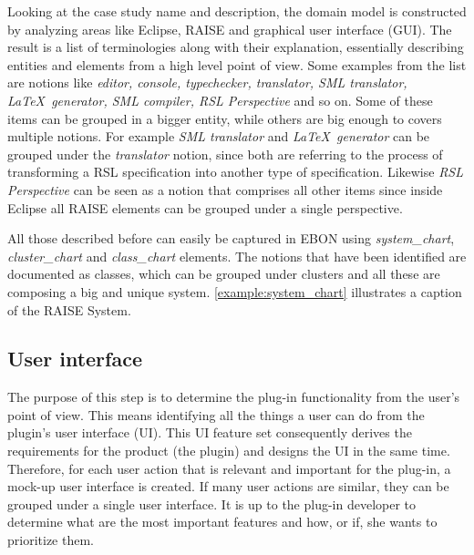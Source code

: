 \documentclass[conference]{IEEEtran}
\begin{document}
Looking at the case study name and description, the domain model is
constructed by analyzing areas like Eclipse, RAISE and graphical user
interface (GUI). The result is a list of terminologies along with
their explanation, essentially describing entities and elements from a
high level point of view. Some examples from the list are notions
like \emph{editor, console, typechecker, translator, SML translator,
\LaTeX\ generator, SML compiler, RSL Perspective} and so on. Some of
these items can be grouped in a bigger entity, while others are
big enough to covers multiple notions. For example \emph{SML translator}
and \emph{\LaTeX\ generator} can be grouped under the
\emph{translator} notion, since both are referring to the process of
transforming a RSL specification into another type of specification.
Likewise \emph{RSL Perspective} can be seen as a notion that comprises
all other items since inside Eclipse all RAISE elements can be grouped
under a single perspective.



All those described before can easily be captured in EBON using
\emph{system\_chart}, \emph{cluster\_chart} and \emph{class\_chart}
elements. The notions that have been identified are documented as
classes, which can be grouped under clusters and all these are
composing a big and unique system. \autoref{example:system_chart}
illustrates a caption of the RAISE System.

%
\subsection{User interface}
\label{sec:user-interface}

The purpose of this step is to determine the plug-in functionality from the
user's point of view. This means identifying all the things a user can
do from the plugin's user interface (UI). This UI feature set
consequently derives the requirements for the product (the plugin) and
designs the UI in the same time. Therefore, for each user action that
is relevant and important for the plug-in, a mock-up user interface is
created. If many user actions are similar, they can be grouped under a
single user interface. It is up to the plug-in developer to determine
what are the most important features and how, or if, she wants to
prioritize them.
\end{document}
